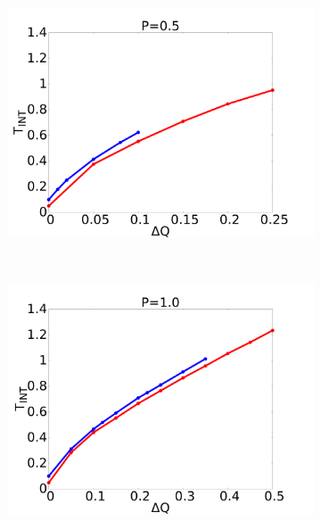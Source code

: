 \documentclass[handout]{beamer}
\begin{document}
\begin{frame}
\begin{figure}[h]
\begin{center}
\begin{subfigure}[t]{0.3\textwidth}
            \includegraphics[scale=0.09]{../images/p05_int.pdf}
        \end{subfigure} 
        \
        \begin{subfigure}[t]{0.3\textwidth}
            \includegraphics[scale=0.09]{../images/p1_int.pdf}
        \end{subfigure} 
        \\
        \begin{subfigure}[t]{0.3\textwidth}

\end{subfigure}
\end{center}
\end{figure}
\end{frame}
\end{document}

